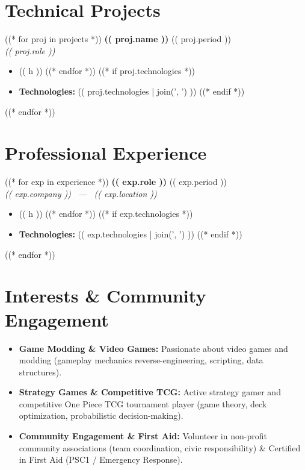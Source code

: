 \documentclass[10pt,a4paper]{article}
\begin{document}
\section{Technical Projects}
((* for proj in projects *))
\noindent
\textbf{(( proj.name ))} \hfill (( proj.period )) \\
\textit{(( proj.role ))}
\begin{itemize}
((* for h in proj.highlights *))
    \item (( h ))
((* endfor *))
((* if proj.technologies *))
    \item \textbf{Technologies:} (( proj.technologies | join(', ') ))
((* endif *))
\end{itemize}
\vspace{0.25em}
((* endfor *))

\section{Professional Experience}
((* for exp in experience *))
\noindent
\textbf{(( exp.role ))} \hfill (( exp.period )) \\
\textit{(( exp.company )) \ --- \ (( exp.location ))}
\begin{itemize}
((* for h in exp.highlights *))
    \item (( h ))
((* endfor *))
((* if exp.technologies *))
    \item \textbf{Technologies:} (( exp.technologies | join(', ') ))
((* endif *))
\end{itemize}
\vspace{0.25em}
((* endfor *))

\section{Interests \& Community Engagement}
\begin{itemize}
    \item \textbf{Game Modding \& Video Games:} Passionate about video games and modding (gameplay mechanics reverse-engineering, scripting, data structures).
    \item \textbf{Strategy Games \& Competitive TCG:} Active strategy gamer and competitive One Piece TCG tournament player (game theory, deck optimization, probabilistic decision-making).
    \item \textbf{Community Engagement \& First Aid:} Volunteer in non-profit community associations (team coordination, civic responsibility) \& Certified in First Aid (PSC1 / Emergency Response).
\end{itemize}
\end{document}
